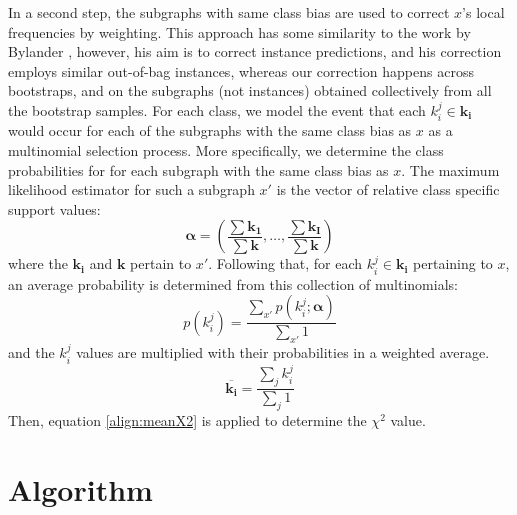 \documentclass{article}
\begin{document}
In a second step, the subgraphs with same class bias are used to correct $x$'s
local frequencies by weighting. This approach has some similarity to the work
by Bylander \cite{bylander02estimating}, however, his aim is to correct
instance predictions, and his correction employs similar out-of-bag instances,
whereas our correction happens across bootstraps, and on the subgraphs (not
instances) obtained collectively from all the bootstrap samples.  For each
class, we model the event that each $k_i^j \in \mathbf{k_i}$ would occur for
each of the subgraphs with the same class bias as $x$ as a multinomial
selection process.  More specifically, we determine the class probabilities for
for each subgraph with the same class bias as $x$. The maximum likelihood
estimator for such a subgraph $x'$ is the vector of relative class specific
support values:
\begin{equation}
  \mathbf{\alpha} = \left(\frac{\sum{\mathbf{k_1}}}{\sum{\mathbf{k}}},\ldots,\frac{\sum{\mathbf{k_I}}}{\sum{\mathbf{k}}}\right)
  \label{eqn:mlexpr}
\end{equation}
where the $\mathbf{k_i}$ and $\mathbf{k}$ pertain to $x'$. Following that, for
each $k_i^j \in \mathbf{k_i}$ pertaining to $x$, an average probability is determined from this
collection of multinomials:
\begin{equation}
  p(k_i^j)=\frac{\sum_{x'} p(k_i^j; \mathbf{\alpha})}{\sum_{x'}1}
  \label{eqn:avgpr}
\end{equation}
and the $k_i^j$ values are multiplied with their probabilities in a weighted average.
\begin{equation}
  \overline{\mathbf{k_i}}=\frac{\sum_j k_i^j}{\sum_j1}
  \label{eqn:avgki}
\end{equation}
Then, equation \ref{align:meanX2} is applied to determine the $\chi^2$ value.

\section{Algorithm}
\end{document}
